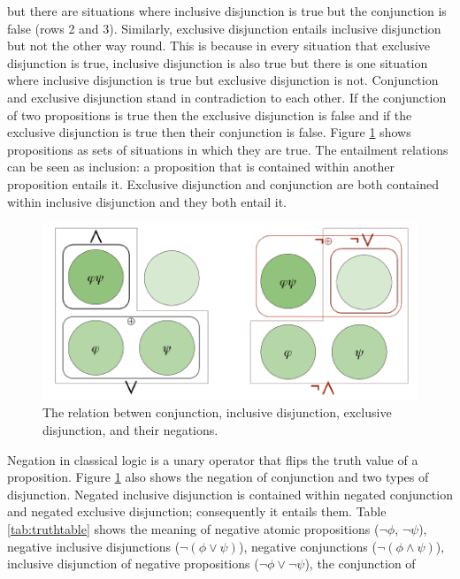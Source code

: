 \documentclass[oneside]{report}
\theoremstyle{definition}
\theoremstyle{definition}
\theoremstyle{definition}
\theoremstyle{remark}
\begin{document}
but there are situations where inclusive disjunction is true but the
conjunction is false (rows 2 and 3). Similarly, exclusive disjunction
entails inclusive disjunction but not the other way round. This is
because in every situation that exclusive disjunction is true, inclusive
disjunction is also true but there is one situation where inclusive
disjunction is true but exclusive disjunction is not. Conjunction and
exclusive disjunction stand in contradiction to each other. If the
conjunction of two propositions is true then the exclusive disjunction
is false and if the exclusive disjunction is true then their conjunction
is false. Figure \ref{fig:entailmentFigure} shows propositions as sets
of situations in which they are true. The entailment relations can be
seen as inclusion: a proposition that is contained within another
proposition entails it. Exclusive disjunction and conjunction are both
contained within inclusive disjunction and they both entail it.
\begin{figure}[tb]

{\centering \includegraphics{figs/entailmentFigure-1} 

}

\caption{The relation betwen conjunction, inclusive disjunction, exclusive disjunction, and their negations.}\label{fig:entailmentFigure}
\end{figure}
Negation in classical logic is a unary operator that flips the truth
value of a proposition. Figure \ref{fig:entailmentFigure} also shows the
negation of conjunction and two types of disjunction. Negated inclusive
disjunction is contained within negated conjunction and negated
exclusive disjunction; consequently it entails them. Table
\ref{tab:truthtable} shows the meaning of negative atomic propositions
(\(\lnot \phi\), \(\lnot \psi\)), negative inclusive disjunctions
(\(\lnot (\phi \lor \psi)\)), negative conjunctions
(\(\lnot (\phi \land \psi)\)), inclusive disjunction of negative
propositions (\(\lnot \phi \lor \lnot \psi\)), the conjunction of
\end{document}
